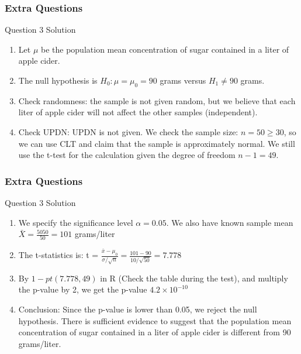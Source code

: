 \documentclass{beamer}
\begin{document}

\begin{frame}
\frametitle{Extra Questions}
\begin{block}{Question 3 Solution}

\begin{enumerate}
\item Let $\mu$ be the population mean concentration of sugar contained in a liter of apple cider.

\item The null hypothesis is $H_0: \mu = \mu_0 = 90$ grams versus $H_1 \ne 90$ grams.

\item Check randomness: the sample is not given random, but we believe that each liter of apple cider will not affect the other samples (independent).

\item Check UPDN: UPDN is not given. We check the sample size: $n = 50 \ge 30$, so we can use CLT and claim that the sample is approximately normal. We still use the t-test for the calculation given the degree of freedom $n-1 = 49$.

\end{enumerate}
\end{block}
\end{frame}


\begin{frame}
\frametitle{Extra Questions}
\begin{block}{Question 3 Solution}

\begin{enumerate}
\item We specify the significance level $\alpha = 0.05$. We also have known sample mean $\bar X = \frac{5050}{50} = 101$ grams/liter 

\item The t-statistics is: t = $\frac{\bar x - \mu_0}{\sigma/\sqrt{n}} = \frac{101 - 90}{10/\sqrt{50}} = 7.778$

\item By $1 - pt(7.778, 49)$ in R (Check the table during the test), and multiply the p-value by 2, we get the p-value $4.2 \times 10^{-10}$

\item Conclusion: Since the p-value is lower than 0.05, we reject the null hypothesis. There is sufficient evidence to suggest that the population mean concentration of sugar contained in a liter of apple cider is different from 90 grams/liter. 

\end{enumerate}
\end{block}
\end{frame}
\end{document}
